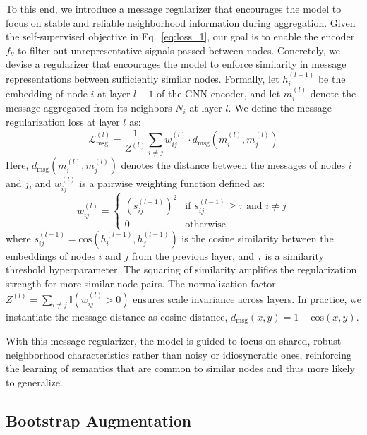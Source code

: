 \documentclass[letterpaper]{article} \usepackage{aaai2026}  \usepackage{times}  \usepackage{helvet}  \usepackage{courier}  \usepackage[hyphens]{url}  \usepackage{graphicx} \urlstyle{rm} \def\UrlFont{\rm}  \usepackage{natbib}  \usepackage{caption} \frenchspacing  \setlength{\pdfpagewidth}{8.5in}  \setlength{\pdfpageheight}{11in}
\begin{document}
To this end, we introduce a message regularizer that encourages the model to focus on stable and reliable neighborhood information during aggregation. Given the self-supervised objective in Eq.~\ref{eq:loss_1}, our goal is to enable the encoder \( f_{\theta} \) to filter out unrepresentative signals passed between nodes. Concretely, we devise a regularizer that encourages the model to enforce similarity in message representations between sufficiently similar nodes.
Formally, let \( h_i^{(l-1)} \) be the embedding of node \( i \) at layer \( l-1 \) of the GNN encoder, and let \( m_i^{(l)} \) denote the message aggregated from its neighbors \( N_i \) at layer \( l \). We define the message regularization loss at layer \( l \) as:
\begin{equation} \label{eq:msg_reg_main}
\mathcal{L}_{\text{msg}}^{(l)} = \frac{1}{Z^{(l)}} \sum_{i \neq j} w_{ij}^{(l)} \cdot d_{\text{msg}}(m_i^{(l)}, m_j^{(l)})
\end{equation}
Here, \( d_{\text{msg}}(m_i^{(l)}, m_j^{(l)}) \) denotes the distance between the messages of nodes \( i \) and \( j \), and \( w_{ij}^{(l)} \) is a pairwise weighting function defined as:
\begin{equation} \label{eq:weight_func_main}
w_{ij}^{(l)} =
\begin{cases}
(s_{ij}^{(l-1)})^2 & \text{if } s_{ij}^{(l-1)} \geq \tau \text{ and } i \neq j \\
0 & \text{otherwise}
\end{cases}
\end{equation}
where \( s_{ij}^{(l-1)} = \text{cos}(h_i^{(l-1)}, h_j^{(l-1)}) \) is the cosine similarity between the embeddings of nodes \( i \) and \( j \) from the previous layer, and \( \tau \) is a similarity threshold hyperparameter. The squaring of similarity amplifies the regularization strength for more similar node pairs. The normalization factor \( Z^{(l)} = \sum_{i \neq j} \mathbb{I}(w_{ij}^{(l)} > 0) \) ensures scale invariance across layers.
In practice, we instantiate the message distance as cosine distance, \( d_{\text{msg}}(x, y) = 1 - \text{cos}(x, y) \).

With this message regularizer, the model is guided to focus on shared, robust neighborhood characteristics rather than noisy or idiosyncratic ones, reinforcing the learning of semantics that are common to similar nodes and thus more likely to generalize.

\subsection{Bootstrap Augmentation}
\label{sec:bootstrap}
\end{document}

